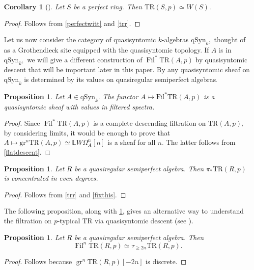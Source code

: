 \documentclass[10pt,letterpaper]{amsart}
\numberwithin{figure}{section}
\numberwithin{equation}{section}
\newtheorem{corollary}[figure]{Corollary}
\newtheorem{proposition}[figure]{Proposition}
\theoremstyle{definition}
\theoremstyle{definition}
\theoremstyle{definition}
\theoremstyle{definition}
\DeclareMathOperator{\gr}{gr}
\DeclareMathOperator{\Fil}{Fil}
\newcommand{\TR}{\mathrm{TR}}
\renewcommand{\L}{\mathbb{L}}
\begin{document}
\begin{corollary}[{\cite[Thm.~6.14]{Ben}}]Let $S$ be a perfect ring. Then $\TR(S,p) \simeq W(S).$
\end{corollary}{}

\begin{proof}
Follows from \cref{perfectwitt} and \cref{trr}. 
\end{proof}{}



Let us now consider the category of quasisyntomic $k$-algebras $\mathrm{qSyn}_k,$ thought of as a Grothendieck site equipped with the quasisyntomic topology. If $A$ is in $\mathrm{qSyn}_k,$ we will give a different construction of $\Fil^* \TR(A,p)$ by quasisyntomic descent that will be important later in this paper. By \cite[Prop.~4.31]{BMS2} any quasisyntomic sheaf on $\mathrm{qSyn}_k$ is determined by its values on quasiregular semiperfect algebras.




\begin{proposition}\label{descent}
    Let $A \in \mathrm{qSyn}_k.$ The functor $A \mapsto \mathrm{Fil}^* \TR(A,p)$ is a quasisyntomic sheaf with values in filtered spectra. 
\end{proposition}{}






\begin{proof}
Since $\Fil^* \TR (A,p)$ is a complete descending filtration on $\TR(A,p)$, by considering limits, it would be enough to prove that $A \mapsto \mathrm{gr}^n\TR(A,p) \simeq \L W\Omega^n_A [n] $ is a sheaf for all $n.$ The latter follows from \cref{flatdescent}.
\end{proof}{}


\begin{proposition}\label{evenn}
    Let $R$ be a quasiregular semiperfect algebra. Then $\pi_* \TR(R,p)$ is concentrated in even degrees.
\end{proposition}{}
\begin{proof}
 Follows from \cref{trr} and \cref{fixthis}.
\end{proof}{}
The following proposition, along with \cref{descent}, gives an alternative way to understand the filtration on $p$-typical $\TR$ via quasisyntomic descent (see \cite[Prop.~4.31]{BMS2}).
\begin{proposition}\label{doublespeed}
Let $R$ be a quasiregular semiperfect algebra. Then $$\Fil^n \TR(R,p) \simeq \tau_{\ge 2n} \TR(R,p).$$
\end{proposition}{}
\begin{proof}
    Follows because $\gr^n \TR(R,p)[-2n]$ is discrete.
\end{proof}
\end{document}
